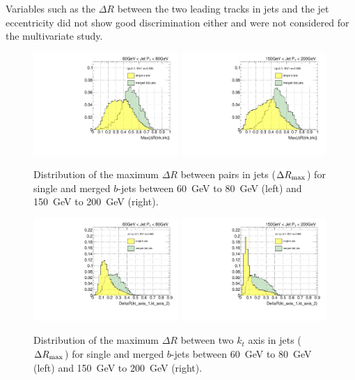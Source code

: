 Variables such as the $\Delta R$ between the two leading tracks in jets and the jet eccentricity did not show good discrimination either and were not considered for the multivariate study.

\begin{figure}[tp]
\centering
\includegraphics[width=0.49\textwidth]{FIGS/VarsSingleMerged/drmax060.pdf}
\includegraphics[width=0.49\textwidth]{FIGS/VarsSingleMerged/drmax150.pdf}
\caption{Distribution of the maximum $\Delta R$ between pairs in jets ($\Delta R_{\rm max}$) for single and merged $b$-jets between 60~GeV to 80~GeV (left) and 150~GeV to 200~GeV (right).}
\label{fig:drmaxsinglemerged}
\end{figure}

\begin{figure}[tp]
\centering
\includegraphics[width=0.49\textwidth]{FIGS/VarsSingleMerged/DRkt2axes060.pdf}
\includegraphics[width=0.49\textwidth]{FIGS/VarsSingleMerged/DRkt2axes150.pdf}
\caption{Distribution of the maximum $\Delta R$ between two $k_t$ axis in jets ($\Delta R_{\rm max}$) for single and merged $b$-jets between 60~GeV to 80~GeV (left) and 150~GeV to 200~GeV (right).}
\label{fig:drktsinglemerged}
\end{figure}

